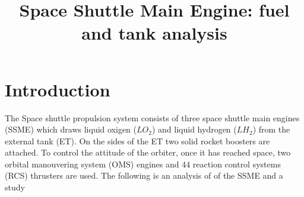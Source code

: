 
\title{Space Shuttle Main Engine: fuel and tank analysis}

    \maketitle
    \tableofcontents
    \newpage
    \section{Introduction}
    The Space shuttle propulsion system consists of three space shuttle main engines (SSME) which draws liquid oxigen ($ LO_2 $) and liquid hydrogen ($ LH_2 $) from the external tank (ET).
    On the sides of the ET two solid rocket boosters are attached.
    To control the attitude of the orbiter, once it has reached space, two orbital manouvering system (OMS) engines and 44 reaction control systems (RCS) thrusters are used.
    The following is an analysis of of the SSME and a study 


